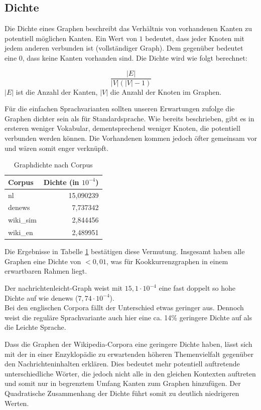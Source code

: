 \documentclass[11pt, a4paper]{article}
\begin{document}
\subsection{Dichte}

Die Dichte eines Graphen beschreibt das Verhältnis von vorhandenen Kanten zu
potentiell möglichen Kanten.
Ein Wert von $1$ bedeutet, dass jeder Knoten mit jedem anderen verbunden ist
(vollständiger Graph).
Dem gegenüber bedeutet eine $0$, dass keine Kanten vorhanden sind.
Die Dichte wird wie folgt berechnet:

$$
    \frac{|E|}{|V|\left(|V|-1\right)}
$$
$|E|$ ist die Anzahl der Kanten, $|V|$ die Anzahl der Knoten im Graphen. 

Für die einfachen Sprachvarianten sollten unseren Erwartungen zufolge die
Graphen dichter sein als für Standardsprache.
Wie bereits beschrieben, gibt es in ersteren weniger Vokabular, dementsprechend
weniger Knoten, die potentiell verbunden werden können. Die Vorhandenen kommen
jedoch öfter gemeinsam vor und wären somit enger verknüpft.

\begin{table}[ht]
  \centering
  \begin{tabular}{lr}
    \toprule
    Corpus            &         Dichte (in $10^{-4}$)\\
    \midrule
    nl                &  		15,090239 \\
    denews            &  		7,737342 \\
    wiki\_sim         &  		2,844456 \\
    wiki\_en          &  		2,489951 \\
    \bottomrule
  \end{tabular}
  \caption{\label{density_table} Graphdichte nach Corpus}
\end{table}

Die Ergebnisse in Tabelle \ref{density_table} bestätigen diese Vermutung.
Insgesamt haben alle Graphen eine Dichte von $<0,01$, was für
Kookkurrenzgraphen in einem erwartbaren Rahmen liegt.

Der nachrichtenleicht-Graph weist mit $15,1\cdot 10^{-4}$ eine fast doppelt so
hohe Dichte auf wie denews ($7,74\cdot 10^{-4}$).\\
Bei den englischen Corpora fällt der Unterschied etwas geringer aus.
Dennoch weist die reguläre Sprachvariante auch hier eine ca. 14\% geringere
Dichte auf als die Leichte Sprache.

Dass die Graphen der Wikipedia-Corpora eine geringere Dichte haben, lässt sich
mit der in einer Enzyklopädie zu erwartenden höheren Themenvielfalt gegenüber
den Nachrichteninhalten erklären.
Dies bedeutet mehr potentiell auftretende unterschiedliche Wörter, die jedoch
nicht alle in den gleichen Kontexten auftreten und somit nur in begrenztem
Umfang Kanten zum Graphen hinzufügen.
Der Quadratische Zusammenhang der Dichte
führt somit zu deutlich niedrigeren Werten. 
\end{document}
